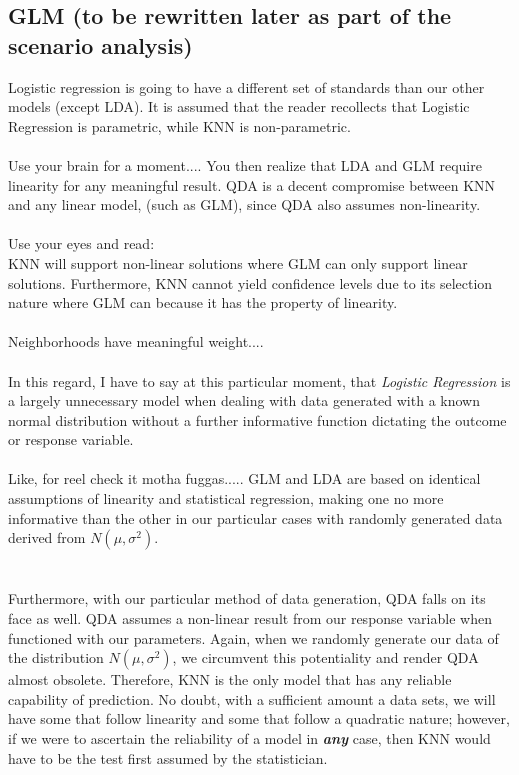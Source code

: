 \documentclass[11pt, oneside]{article}
\begin{document}
\subsection*{GLM (to be rewritten later as part of the scenario analysis)}
Logistic regression is going to have a different set of standards than our other models (except LDA). It is assumed that the reader recollects that Logistic Regression is parametric, while KNN is non-parametric.\\
\\
Use your brain for a moment.... You then realize that LDA and GLM require linearity for any meaningful result. QDA is a decent compromise between KNN and any linear model, (such as GLM), since QDA also assumes non-linearity.\\
\\
Use your eyes and read:\\
KNN will support non-linear solutions where GLM can only support linear solutions. Furthermore, KNN cannot yield confidence levels due to its selection nature where GLM can because it has the property of linearity.\\
\\
Neighborhoods have meaningful weight....\\
\\
In this regard, I have to say at this particular moment, that \emph{Logistic Regression} is a largely unnecessary model when dealing with data generated with a known normal distribution without a further informative function dictating the outcome or response variable.\\
\\
Like, for reel check it motha fuggas..... GLM and LDA are based on identical assumptions of linearity and statistical regression, making one no more informative than the other in our particular cases with randomly generated data derived from $N(\mu, \sigma^2)$.\\
\\
\\
Furthermore, with our particular method of data generation, QDA falls on its face as well. QDA assumes a non-linear result from our response variable when functioned with our parameters. Again, when we randomly generate our data of the distribution $N(\mu, \sigma^2)$, we circumvent this potentiality and render QDA almost obsolete. Therefore, KNN is the only model that has any reliable capability of prediction. No doubt, with a sufficient amount a data sets, we will have some that follow linearity and some that follow a quadratic nature; however, if we were to ascertain the reliability of a model in \textbf{\emph{any}} case, then KNN would have to be the test first assumed by the statistician.
\end{document}
